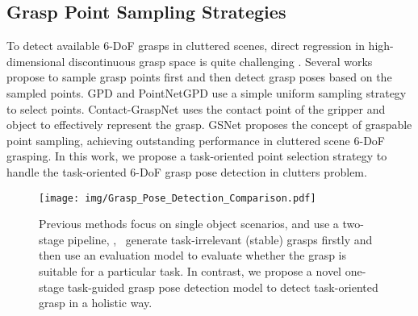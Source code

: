 \subsection{Grasp Point Sampling Strategies}
To detect available 6-DoF grasps in cluttered scenes, direct regression in high-dimensional discontinuous grasp space is quite challenging \cite{mousavian20196dofgraspnet}. 
Several works propose to sample grasp points first and then detect grasp poses based on the sampled points. 
GPD \cite{GPD} and PointNetGPD \cite{pointnetGPD} use a simple uniform sampling strategy to select points. 
Contact-GraspNet \cite{sundermeyer2021contact} uses the contact point of the gripper and object to effectively represent the grasp.
GSNet \cite{GSNet} proposes the concept of graspable point sampling, achieving outstanding performance in cluttered scene 6-DoF grasping. 
In this work, we propose a task-oriented point selection strategy to handle the task-oriented 6-DoF grasp pose detection in clutters problem. 
\begin{figure}[t]
    \centering
    \vspace{0.2cm}
    \texttt{[image: img/Grasp\_Pose\_Detection\_Comparison.pdf]}
    \caption{Previous methods \cite{chen2022TOG, tang2023graspgpt} focus on single object scenarios, and use a two-stage pipeline, \ie,~ generate task-irrelevant (stable) grasps firstly and then use an evaluation model to evaluate whether the grasp is suitable for a particular task. 
    In contrast, we propose a novel one-stage task-guided grasp pose detection model to detect task-oriented grasp in a holistic way.}
    \label{fig:grasp_pose_generation_comparison}
    \vspace{-0.2cm}
\end{figure}